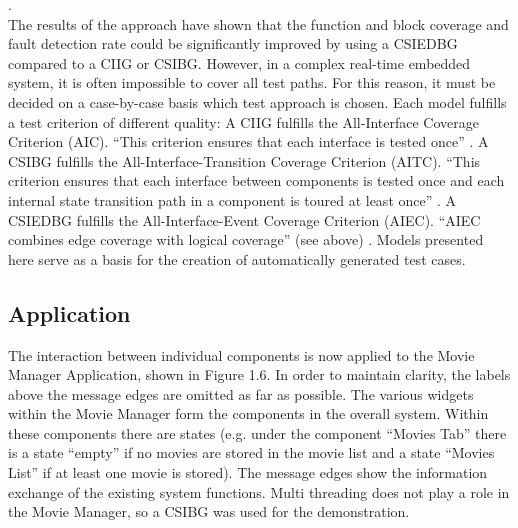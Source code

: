 \cite{Guan2015}.\\
The results of the approach have shown that the function and block
coverage and fault detection rate could be significantly improved
by using a CSIEDBG compared to a CIIG or CSIBG. However, in a complex
real-time embedded system, it is often impossible to cover all test
paths. For this reason, it must be decided on a case-by-case basis
which test approach is chosen. Each model fulfills a test criterion
of different quality: A CIIG fulfills the All-Interface Coverage Criterion
(AIC). \enquote{This criterion ensures that each interface is tested once}
\cite{Guan2015}. A CSIBG fulfills the All-Interface-Transition Coverage
Criterion (AITC). \enquote{This criterion ensures that each interface between
components is tested once and each internal state transition path
in a component is toured at least once} \cite{Guan2015}. A CSIEDBG
fulfills the All-Interface-Event Coverage Criterion (AIEC). \enquote{AIEC
combines edge coverage with logical coverage} (see above) \cite{Guan2015}.
Models presented here serve as a basis for the creation of automatically
generated test cases.

\subsection{Application}

The interaction between individual components is now applied to the
Movie Manager Application, shown in Figure 1.6. In order to maintain
clarity, the labels above the message edges are omitted as far as
possible. The various widgets within the Movie Manager form the components
in the overall system. Within these components there are states (e.g.
under the component \enquote{Movies Tab} there is
a state \enquote{empty} if no movies are stored
in the movie list and a state \enquote{Movies List}
if at least one movie is stored). The message edges show the information
exchange of the existing system functions. Multi threading does not
play a role in the Movie Manager, so a CSIBG was used for the demonstration.

